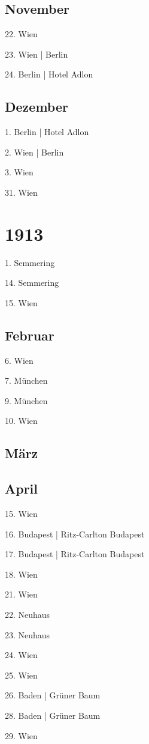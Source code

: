 \documentclass[twoside=false,titlepage=false,open=any, parskip=never, fontsize=10pt, headings=small, chapterprefix=false, appendixprefix=false, DIV=15]{scrbook}
\begin{document}
\begin{multicols}{3}
            \section*{November}
            22. Wien\par
            23. Wien | Berlin\par
            24. Berlin | Hotel Adlon\par
            \section*{Dezember}
            1. Berlin | Hotel Adlon\par
            2. Wien | Berlin\par
            3. Wien\par
            31. Wien\par
            \chapter*{1913}
            1. Semmering\par
            14. Semmering\par
            15. Wien\par
            \section*{Februar}
            6. Wien\par
            7. München\par
            9. München\par
            10. Wien\par
            \section*{März}
            \section*{April}
            15. Wien\par
            16. Budapest | Ritz-Carlton Budapest\par
            17. Budapest | Ritz-Carlton Budapest\par
            18. Wien\par
            21. Wien\par
            22. Neuhaus\par
            23. Neuhaus\par
            24. Wien\par
            25. Wien\par
            26. Baden | Grüner Baum\par
            28. Baden | Grüner Baum\par
            29. Wien\par

\end{multicols}
\end{document}
